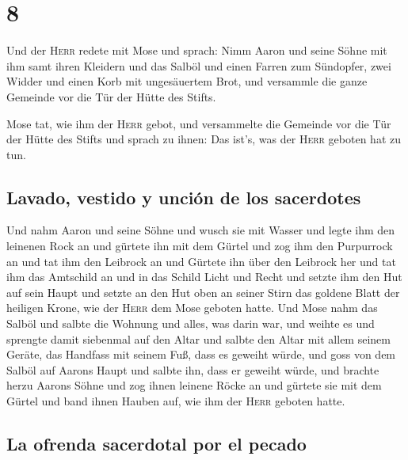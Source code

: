 \hypertarget{section-7}{%
\section{8}\label{section-7}}

 Und der \textsc{Herr} redete mit Mose und sprach:
 Nimm Aaron und seine Söhne mit ihm samt ihren Kleidern
und das Salböl und einen Farren zum Sündopfer, zwei Widder und einen
Korb mit ungesäuertem Brot,  und versammle die ganze
Gemeinde vor die Tür der Hütte des Stifts.

 Mose tat, wie ihm der \textsc{Herr} gebot, und
versammelte die Gemeinde vor die Tür der Hütte des Stifts 
und sprach zu ihnen: Das ist's, was der \textsc{Herr} geboten hat zu
tun.

\hypertarget{lavado-vestido-y-unciuxf3n-de-los-sacerdotes}{%
\subsection{Lavado, vestido y unción de los
sacerdotes}\label{lavado-vestido-y-unciuxf3n-de-los-sacerdotes}}

 Und nahm Aaron und seine Söhne und wusch sie mit Wasser
 und legte ihm den leinenen Rock an und gürtete ihn mit
dem Gürtel und zog ihm den Purpurrock an und tat ihm den Leibrock an und
Gürtete ihn über den Leibrock her  und tat ihm das
Amtschild an und in das Schild Licht und Recht  und setzte
ihm den Hut auf sein Haupt und setzte an den Hut oben an seiner Stirn
das goldene Blatt der heiligen Krone, wie der \textsc{Herr} dem Mose
geboten hatte.  Und Mose nahm das Salböl und salbte die
Wohnung und alles, was darin war, und weihte es  und
sprengte damit siebenmal auf den Altar und salbte den Altar mit allem
seinem Geräte, das Handfass mit seinem Fuß, dass es geweiht würde,
 und goss von dem Salböl auf Aarons Haupt und salbte ihn,
dass er geweiht würde,  und brachte herzu Aarons Söhne
und zog ihnen leinene Röcke an und gürtete sie mit dem Gürtel und band
ihnen Hauben auf, wie ihm der \textsc{Herr} geboten hatte.

\hypertarget{la-ofrenda-sacerdotal-por-el-pecado}{%
\subsection{La ofrenda sacerdotal por el
pecado}\label{la-ofrenda-sacerdotal-por-el-pecado}}

